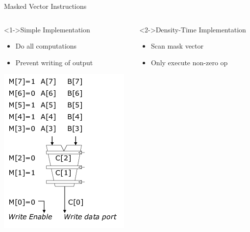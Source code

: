 \documentclass[presentation]{beamer}
\begin{document}
\begin{frame}[label={sec:orgd749335}]{Masked Vector Instructions}
\begin{columns}
\begin{column}{.49\columnwidth}
\begin{block}<1->{Simple Implementation}
\begin{itemize}
\item \small Do all computations
\item \small Prevent writing of output
\end{itemize}
\begin{center}
\includegraphics[width=.9\linewidth]{./images/slides_SIMD_46_small1.png}
\end{center}
\end{block}
\end{column}
\begin{column}[ignoreheading]{.49\columnwidth}
\begin{block}<2->{Density-Time Implementation}
\begin{itemize}
\item Scan mask vector
\item Only execute non-zero op

\end{itemize}
\end{block}
\end{column}
\end{columns}
\end{frame}
\end{document}

